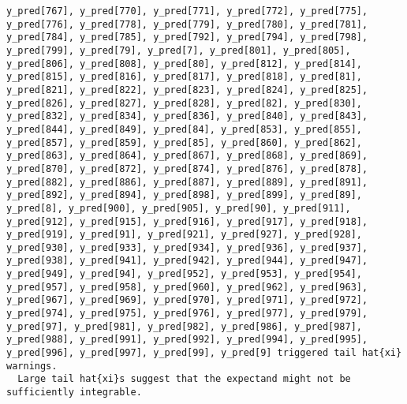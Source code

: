 \documentclass[
  letterpaper,
  DIV=11,
  numbers=noendperiod]{scrartcl}
\begin{document}
\begin{verbatim}
y_pred[767], y_pred[770], y_pred[771], y_pred[772], y_pred[775],
y_pred[776], y_pred[778], y_pred[779], y_pred[780], y_pred[781],
y_pred[784], y_pred[785], y_pred[792], y_pred[794], y_pred[798],
y_pred[799], y_pred[79], y_pred[7], y_pred[801], y_pred[805],
y_pred[806], y_pred[808], y_pred[80], y_pred[812], y_pred[814],
y_pred[815], y_pred[816], y_pred[817], y_pred[818], y_pred[81],
y_pred[821], y_pred[822], y_pred[823], y_pred[824], y_pred[825],
y_pred[826], y_pred[827], y_pred[828], y_pred[82], y_pred[830],
y_pred[832], y_pred[834], y_pred[836], y_pred[840], y_pred[843],
y_pred[844], y_pred[849], y_pred[84], y_pred[853], y_pred[855],
y_pred[857], y_pred[859], y_pred[85], y_pred[860], y_pred[862],
y_pred[863], y_pred[864], y_pred[867], y_pred[868], y_pred[869],
y_pred[870], y_pred[872], y_pred[874], y_pred[876], y_pred[878],
y_pred[882], y_pred[886], y_pred[887], y_pred[889], y_pred[891],
y_pred[892], y_pred[894], y_pred[898], y_pred[899], y_pred[89],
y_pred[8], y_pred[900], y_pred[905], y_pred[90], y_pred[911],
y_pred[912], y_pred[915], y_pred[916], y_pred[917], y_pred[918],
y_pred[919], y_pred[91], y_pred[921], y_pred[927], y_pred[928],
y_pred[930], y_pred[933], y_pred[934], y_pred[936], y_pred[937],
y_pred[938], y_pred[941], y_pred[942], y_pred[944], y_pred[947],
y_pred[949], y_pred[94], y_pred[952], y_pred[953], y_pred[954],
y_pred[957], y_pred[958], y_pred[960], y_pred[962], y_pred[963],
y_pred[967], y_pred[969], y_pred[970], y_pred[971], y_pred[972],
y_pred[974], y_pred[975], y_pred[976], y_pred[977], y_pred[979],
y_pred[97], y_pred[981], y_pred[982], y_pred[986], y_pred[987],
y_pred[988], y_pred[991], y_pred[992], y_pred[994], y_pred[995],
y_pred[996], y_pred[997], y_pred[99], y_pred[9] triggered tail hat{xi}
warnings.
  Large tail hat{xi}s suggest that the expectand might not be
sufficiently integrable.
 

\end{verbatim}
\end{document}
